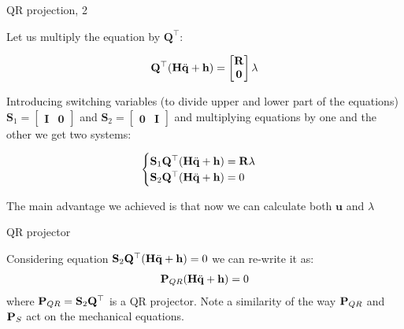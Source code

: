 \documentclass{beamer}
\begin{document}
\begin{frame}{QR projection, 2}
	\begin{flushleft}
		
		Let us multiply the equation by $\mathbf{Q}^\top$:
		
		\begin{equation}
			\mathbf{Q}^\top (\mathbf{H}\ddot{\mathbf{q}} + \mathbf{h}) = \begin{bmatrix} \mathbf{R} \\ \mathbf{0}  \end{bmatrix} \lambda
		\end{equation}
		
		Introducing switching variables (to divide upper and lower part of the equations) $\mathbf{S}_1 = \begin{bmatrix} \mathbf{I} & \mathbf{0}  \end{bmatrix}$ and $\mathbf{S}_2 = \begin{bmatrix} \mathbf{0} & \mathbf{I}  \end{bmatrix}$ and multiplying equations by one and the other we get two systems:
		
		\begin{equation}
			\begin{cases}
				\mathbf{S}_1 \mathbf{Q}^\top (\mathbf{H}\ddot{\mathbf{q}} + \mathbf{h}) =\mathbf{R} \lambda 
				\\
				\mathbf{S}_2 \mathbf{Q}^\top (\mathbf{H}\ddot{\mathbf{q}} + \mathbf{h}) = 0
			\end{cases}
		\end{equation}
		
		The main advantage we achieved is that now we can calculate both $\mathbf{u}$ and $\lambda$
		
	\end{flushleft}
\end{frame}


\begin{frame}{QR projector}
	\begin{flushleft}
		
		Considering equation $\mathbf{S}_2 \mathbf{Q}^\top (\mathbf{H}\ddot{\mathbf{q}} + \mathbf{h}) = 0$ we can re-write it as:
		\begin{align}
				\mathbf{P}_{QR} (\mathbf{H}\ddot{\mathbf{q}} + \mathbf{h}) = 0
		\end{align}
		where $\mathbf{P}_{QR} = \mathbf{S}_2 \mathbf{Q}^\top$ is a QR projector. Note a similarity of the way $\mathbf{P}_{QR}$ and $\mathbf{P}_S$ act on the mechanical equations.
		
	\end{flushleft}
\end{frame}
\end{document}
